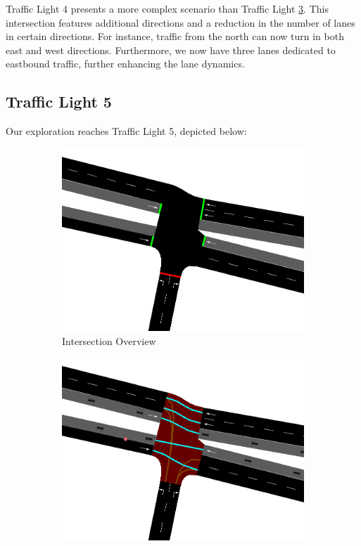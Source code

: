 Traffic Light 4 presents a more complex scenario than Traffic Light \hyperref[sec:tl-3]{3}. This intersection features additional directions and a reduction in the number of lanes in certain directions. For instance, traffic from the north can now turn in both east and west directions. Furthermore, we now have three lanes dedicated to eastbound traffic, further enhancing the lane dynamics.

\newpage

\subsection{Traffic Light 5} \label{sec:tl-5}
Our exploration reaches Traffic Light 5, depicted below:

\begin{figure}[h]
    \centering
    \begin{subfigure}{0.45\textwidth}
        \centering
        \includegraphics[width=\linewidth]{images/methodology/tl-5-street.png}
        \caption{Intersection Overview}
    \end{subfigure}
    \hfill
    \begin{subfigure}{0.45\textwidth}
        \centering
        \includegraphics[width=\linewidth]{images/methodology/tl-5-directions.png}

\end{subfigure}
\end{figure}
